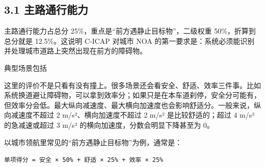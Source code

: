 \subsection{3.1 主路通行能力}

主路通行能力占总分 25\%，重点是“前方遇静止目标物”，二级权重 50\%，折算到总分就是 12.5\%。这说明 C-ICAP 对城市 NOA 的第一要求是：系统必须能识别并处理城市道路上突然出现在前方的障碍物。

典型场景包括

这里的评价不是只看有没有撞上。很多场景还会看安全、舒适、效率三件事。比如系统换道避让障碍物，可以拿到效率分；如果只是在本车道刹停，安全分可能有，但效率分会低。最大纵向减速度、最大横向加速度也会影响舒适分。一般来说，纵向减速度不超过 2 m/s²、横向加速度不超过 2 m/s² 是比较舒适的；超过 4 m/s² 的急减速或超过 3 m/s² 的横向加速度，分数会明显下降甚至为 0。

以城市领航里常见的“前方遇静止目标物”为例，通常是：

\texttt{单项得分 = 安全 × 50\% + 舒适 × 25\% + 效率 × 25\%}
